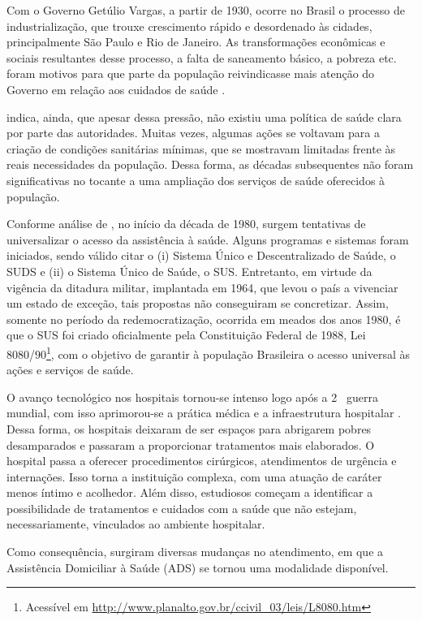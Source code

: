 Com o Governo Getúlio Vargas, a partir de 1930, ocorre no Brasil o processo de
industrialização, que trouxe crescimento rápido e desordenado às cidades,
principalmente São Paulo e Rio de Janeiro. As transformações econômicas e
sociais resultantes desse processo, a falta de saneamento básico, a pobreza etc.
foram motivos para que parte da população reivindicasse mais atenção do Governo
em relação aos cuidados de saúde \cite{carvalho1984}.

 indica, ainda, que apesar dessa pressão, não existiu
uma política de saúde clara por parte das autoridades. Muitas vezes, algumas
ações se voltavam para a criação de condições sanitárias mínimas, que se
mostravam limitadas frente às reais necessidades da população. Dessa forma, as
décadas subsequentes não foram significativas no tocante a uma ampliação dos
serviços de saúde oferecidos à população.

Conforme análise de , no início da década de 1980, surgem
tentativas de universalizar o acesso da assistência à saúde. Alguns programas e
sistemas foram iniciados, sendo válido citar o (i) Sistema Único e
Descentralizado de Saúde, o SUDS e (ii) o Sistema Único de Saúde, o SUS.
Entretanto, em virtude da vigência da ditadura militar, implantada em 1964, que
levou o país a vivenciar um estado de exceção, tais propostas não conseguiram se
concretizar. Assim, somente no período da redemocratização, ocorrida em meados
dos anos 1980, é que o SUS foi criado oficialmente pela Constituição Federal de
1988, Lei 8080/90\footnote{Acessível em
\url{http://www.planalto.gov.br/ccivil_03/leis/L8080.htm}}, com o  objetivo de
garantir à população Brasileira o acesso universal às ações e  serviços de
saúde.

O avanço tecnológico nos hospitais tornou-se intenso logo após a 
2\textordfeminine~ guerra mundial, com isso aprimorou-se a prática médica
e a infraestrutura hospitalar \cite{noronha2008sistema}. Dessa forma, os 
hospitais deixaram de ser espaços para abrigarem pobres desamparados e passaram
a proporcionar tratamentos mais elaborados. O hospital passa a oferecer
procedimentos cirúrgicos, atendimentos de urgência e internações. Isso torna a
instituição complexa, com uma atuação de caráter menos íntimo e acolhedor. Além
disso, estudiosos começam a identificar a possibilidade de tratamentos e
cuidados com a  saúde que não estejam, necessariamente, vinculados ao ambiente
hospitalar.

Como consequência, surgiram diversas mudanças no atendimento, em que a Assistência
Domiciliar à Saúde (ADS) se tornou uma modalidade disponível.


